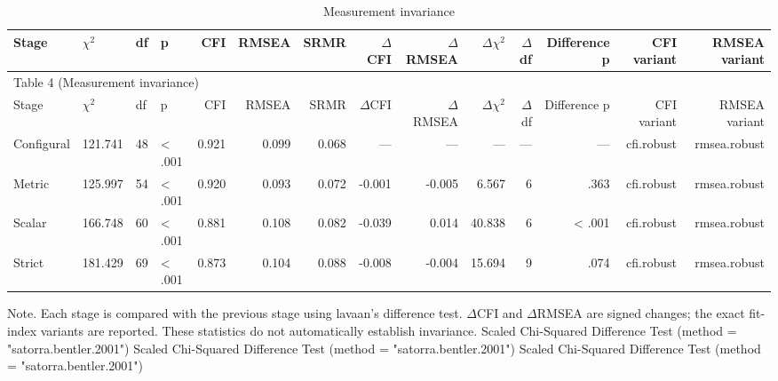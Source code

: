 \documentclass[11pt]{article}
\begin{document}
\begin{landscape}
\small
\begin{longtable}{llllrrrrrrrrrr}
\caption{Measurement invariance}\\
\toprule
Stage & $\chi$$^{2}$ & df & p & CFI & RMSEA & SRMR & $\Delta$CFI & $\Delta$RMSEA & $\Delta$$\chi$$^{2}$ & $\Delta$df & Difference p & CFI variant & RMSEA variant \\
\midrule
\endfirsthead
\multicolumn{14}{l}{Table 4 (Measurement invariance)} \\
\toprule
Stage & $\chi$$^{2}$ & df & p & CFI & RMSEA & SRMR & $\Delta$CFI & $\Delta$RMSEA & $\Delta$$\chi$$^{2}$ & $\Delta$df & Difference p & CFI variant & RMSEA variant \\
\midrule
\endhead
Configural & 121.741 & 48 & < .001 & 0.921 & 0.099 & 0.068 & — & — & — & — & — & cfi.robust & rmsea.robust \\
Metric & 125.997 & 54 & < .001 & 0.920 & 0.093 & 0.072 & -0.001 & -0.005 & 6.567 & 6 & .363 & cfi.robust & rmsea.robust \\
Scalar & 166.748 & 60 & < .001 & 0.881 & 0.108 & 0.082 & -0.039 & 0.014 & 40.838 & 6 & < .001 & cfi.robust & rmsea.robust \\
Strict & 181.429 & 69 & < .001 & 0.873 & 0.104 & 0.088 & -0.008 & -0.004 & 15.694 & 9 & .074 & cfi.robust & rmsea.robust \\
\bottomrule
\end{longtable}
\noindent Note. Each stage is compared with the previous stage using lavaan's difference test. $\Delta$CFI and $\Delta$RMSEA are signed changes; the exact fit-index variants are reported. These statistics do not automatically establish invariance. Scaled Chi-Squared Difference Test (method = "satorra.bentler.2001") Scaled Chi-Squared Difference Test (method = "satorra.bentler.2001") Scaled Chi-Squared Difference Test (method = "satorra.bentler.2001")\par
\end{landscape}
\end{document}
